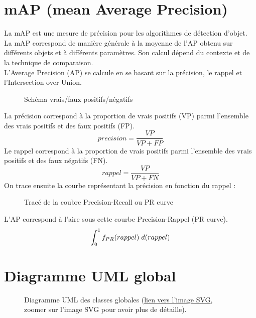 \begin{appendices}
	
\section*{mAP (mean Average Precision)}\label{app:mAP}
La mAP est une mesure de précision pour les algorithmes de détection d'objet. La mAP correspond de manière générale à la moyenne de l'AP obtenu sur différents objets et à différents paramètres. Son calcul dépend du contexte et de la technique de comparaison.\\
L'Average Precision (AP) se calcule en se basant sur la précision, le rappel et l'Intersection over Union. 
\begin{figure}[!htbp]
\center
\caption{Schéma vrais/faux positifs/négatifs}
\label{fig:schema_vraifaux}
\end{figure}
\FloatBarrier
La précision correspond à la proportion de vrais positifs (VP) parmi l'ensemble des vrais positifs et des faux positifs (FP). 
$$precision = \frac{VP}{VP+FP}$$
Le rappel correspond à la proportion de vrais positifs parmi l'ensemble des vrais positifs et des faux négatifs (FN).
$$rappel = \frac{VP}{VP+FN}$$
On trace ensuite la courbe représentant la précision en fonction du rappel : 
\begin{figure}[!htbp]
\center
\caption{Tracé de la coubre Precision-Recall ou PR curve}
\label{fig:trace_prcurve}
\end{figure}
\FloatBarrier
L'AP correspond à l'aire sous cette courbe Precision-Rappel (PR curve). 
$$\int_{0}^{1} f_{PR}(rappel) \hspace{0.1cm} d(rappel)$$

	

	
\clearpage
\section*{Diagramme UML global}\label{app:UMLGlobal}
\begin{figure}[!htbp]
	\center
	\caption{Diagramme UML des classes globales (\href{https://raw.githubusercontent.com/gabriel-combe/Cuttlefish_Tracker/test/rapport/UML/classes.svg}{lien vers l'image SVG}, zoomer sur l'image SVG pour avoir plus de détaille).}
	\label{fig:uml_diagram_classes}
\end{figure}
\FloatBarrier
	


\end{appendices}
